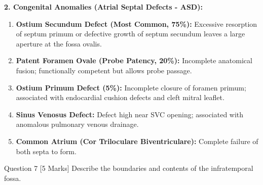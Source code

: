 \documentclass[11pt,a4paper]{article}
\begin{document}
\begin{ansbox}
\textbf{2. Congenital Anomalies (Atrial Septal Defects - ASD):}
\begin{enumerate}[leftmargin=*]
    \item \textbf{Ostium Secundum Defect (Most Common, 75\%):} Excessive resorption of septum primum or defective growth of septum secundum leaves a large aperture at the fossa ovalis.
    \item \textbf{Patent Foramen Ovale (Probe Patency, 20\%):} Incomplete anatomical fusion; functionally competent but allows probe passage.
    \item \textbf{Ostium Primum Defect (5\%):} Incomplete closure of foramen primum; associated with endocardial cushion defects and cleft mitral leaflet.
    \item \textbf{Sinus Venosus Defect:} Defect high near SVC opening; associated with anomalous pulmonary venous drainage.
    \item \textbf{Common Atrium (Cor Triloculare Biventriculare):} Complete failure of both septa to form.
\end{enumerate}
\end{ansbox}

\begin{qbox}{Question 7 [5 Marks]}
Describe the boundaries and contents of the infratemporal fossa.
\end{qbox}
\end{document}
